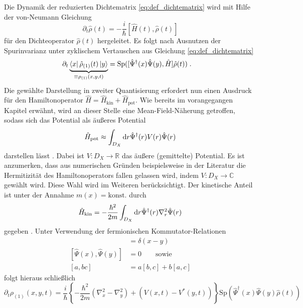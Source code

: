 \subsubsection{\lvn}\index{\lvn}
Die Dynamik der reduzierten Dichtematrix \eqref{eq:def_dichtematrix} wird mit Hilfe der von-Neumann Gleichung
\begin{equation*}
    \partial_t \hat{\rho}(t) = - \frac{i}{\hbar}[\hat{H}(t), \hat{\rho}(t)]
\end{equation*}
für den Dichteoperator $\hat{\rho}(t)$ hergeleitet. Es folgt nach Ausnutzen der Spurinvarianz unter zyklischem Vertauschen aus Gleichung \eqref{eq:def_dichtematrix}
\begin{align*}
  \partial_t \underbrace{\bra{x}\hat{\rho}_{(1)}(t) \ket{y}}_{\equiv \rho_{(1)}(x,y,t)} &= \text{Sp}([\hat{\Psi}^{\dagger}(x)\hat{\Psi}(y),\hat{H}]\hat{\rho}(t)) \; .
\end{align*}
Die gewählte Darstellung in zweiter Quantisierung erfordert nun einen Ausdruck für den Hamiltonoperator ${\hat{H}=\hat{H}_{\text{kin}} + \hat{H}_{\text{pot}}}$. Wie bereits im vorangegangen Kapitel erwähnt, wird an dieser Stelle eine Mean-Field-Näherung getroffen, sodass sich das Potential als äußeres Potential
\begin{equation}
    \hat{H}_{\text{pot}} \approx \int_{D_X} \mathop{}\!\mathrm{d} r \hat{\Psi}^{\dagger}(r)V(r)\hat{\Psi}(r)
    \label{eq:Hpot}
\end{equation}
darstellen lässt \cite{modern}. Dabei ist ${V: D_X \rightarrow \mathbb{R}}$ das äußere (gemittelte) Potential. Es ist anzumerken, dass aus numerischen Gründen beispielsweise in der Literatur \cite{lukas1} die Hermitizität des Hamiltonoperators fallen gelassen wird, indem ${V: D_X \rightarrow \mathbb{C}}$ gewählt wird. Diese Wahl wird im Weiteren berücksichtigt. Der kinetische Anteil ist unter der Annahme ${m(x)=\text{konst.}}$ durch
\begin{equation*}
  \hat{H}_{\text{kin}} = -\frac{\hbar^2}{2m}\int_{D_X} \mathop{}\!\mathrm{d} r \hat{\Psi}^{\dagger}(r)\nabla_r^2\hat{\Psi}(r)
\end{equation*}
gegeben \cite{modern}. Unter Verwendung der fermionischen Kommutator-Relationen   \cite{modern}
\begin{align*}
  [\hat{\Psi}(x),\hat{\Psi}^{\dagger}(y)]&=\delta(x-y) \\
  [\hat{\Psi}(x),\hat{\Psi}(y)]&=0  \qquad \text{sowie}\\
  [a,bc]&=a[b,c]+b[a,c]
\end{align*}
folgt hieraus schließlich
\begin{equation*}
  \partial_t \rho_{(1)}(x,y,t) = \frac{i}{\hbar}\left\{-\frac{\hbar^2}{2m}(\nabla_x^2 - \nabla_y^2) + (V(x,t) - V^*(y,t)) \right\}
                          \text{Sp}(\hat{\Psi}^{\dagger}(x) \hat{\Psi}(y) \hat{\rho}(t))
\end{equation*}
